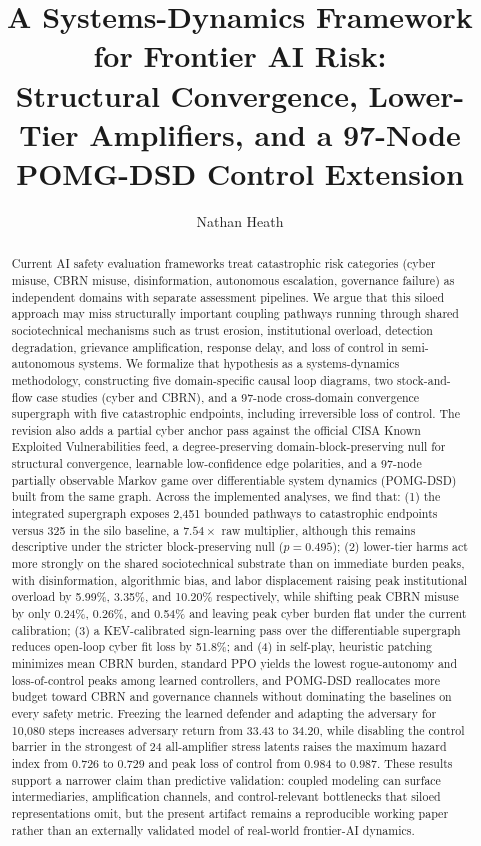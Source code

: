 \documentclass[11pt]{article}
\title{A Systems-Dynamics Framework for Frontier AI Risk:\\Structural Convergence, Lower-Tier Amplifiers, and a 97-Node POMG-DSD Control Extension}
\author{
  Nathan Heath
}
\date{}
\newcommand{\workingpaperstamp}{%
  \AddToShipoutPictureFG*{%
    \AtPageUpperLeft{%
      \raisebox{-0.53\paperheight}[0pt][0pt]{%
        \makebox[\paperwidth][r]{%
          \hspace{-0.45in}%
          \rotatebox{90}{\color{gray!75}\sffamily\bfseries\fontsize{9}{11}\selectfont Working Paper}%
        }%
      }%
    }%
  }%
}
\begin{document}
\workingpaperstamp
\maketitle

\begin{abstract}
Current AI safety evaluation frameworks treat catastrophic risk categories (cyber misuse, CBRN misuse, disinformation, autonomous escalation, governance failure) as independent domains with separate assessment pipelines. We argue that this siloed approach may miss structurally important coupling pathways running through shared sociotechnical mechanisms such as trust erosion, institutional overload, detection degradation, grievance amplification, response delay, and loss of control in semi-autonomous systems. We formalize that hypothesis as a systems-dynamics methodology, constructing five domain-specific causal loop diagrams, two stock-and-flow case studies (cyber and CBRN), and a 97-node cross-domain convergence supergraph with five catastrophic endpoints, including irreversible loss of control. The revision also adds a partial cyber anchor pass against the official CISA Known Exploited Vulnerabilities feed, a degree-preserving domain-block-preserving null for structural convergence, learnable low-confidence edge polarities, and a 97-node partially observable Markov game over differentiable system dynamics (POMG-DSD) built from the same graph. Across the implemented analyses, we find that: (1) the integrated supergraph exposes 2,451 bounded pathways to catastrophic endpoints versus 325 in the silo baseline, a $7.54\times$ raw multiplier, although this remains descriptive under the stricter block-preserving null ($p = 0.495$); (2) lower-tier harms act more strongly on the shared sociotechnical substrate than on immediate burden peaks, with disinformation, algorithmic bias, and labor displacement raising peak institutional overload by 5.99\%, 3.35\%, and 10.20\% respectively, while shifting peak CBRN misuse by only 0.24\%, 0.26\%, and 0.54\% and leaving peak cyber burden flat under the current calibration; (3) a KEV-calibrated sign-learning pass over the differentiable supergraph reduces open-loop cyber fit loss by 51.8\%; and (4) in self-play, heuristic patching minimizes mean CBRN burden, standard PPO yields the lowest rogue-autonomy and loss-of-control peaks among learned controllers, and POMG-DSD reallocates more budget toward CBRN and governance channels without dominating the baselines on every safety metric. Freezing the learned defender and adapting the adversary for 10,080 steps increases adversary return from 33.43 to 34.20, while disabling the control barrier in the strongest of 24 all-amplifier stress latents raises the maximum hazard index from 0.726 to 0.729 and peak loss of control from 0.984 to 0.987. These results support a narrower claim than predictive validation: coupled modeling can surface intermediaries, amplification channels, and control-relevant bottlenecks that siloed representations omit, but the present artifact remains a reproducible working paper rather than an externally validated model of real-world frontier-AI dynamics.
\end{abstract}
\end{document}
